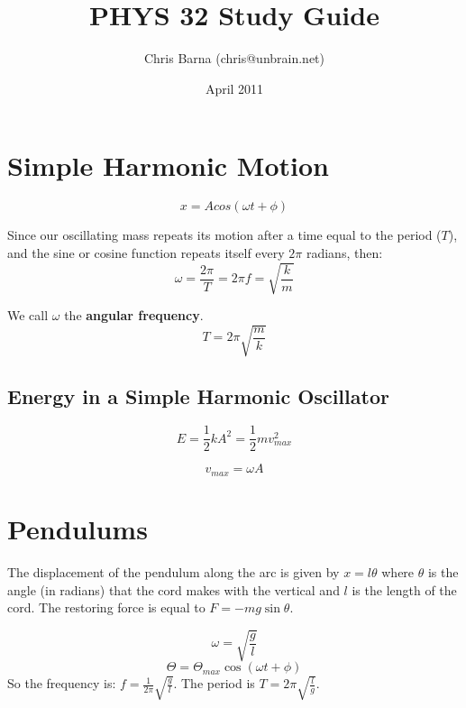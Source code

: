 \documentclass{article}
\begin{document}
\title{PHYS 32 Study Guide}
\author{Chris Barna (chris@unbrain.net)}
\date{April 2011}

\maketitle

\section{Simple Harmonic Motion}
\begin{equation}
  x=Acos(\omega t + \phi)
\end{equation}

Since our oscillating mass repeats its motion after a time equal to the period ($T$), and the sine or cosine function repeats itself every $2\pi$ radians, then:
\begin{equation}
  \omega = \frac{2 \pi}{T} = 2 \pi f = \sqrt{\frac{k}{m}}
\end{equation}

We call $\omega$ the \textbf{angular frequency}.
\begin{equation}
  T = 2 \pi \sqrt{\frac{m}{k}}
\end{equation}

\subsection{Energy in a Simple Harmonic Oscillator} %
\begin{equation}
  E = \frac{1}{2}kA^2 = \frac{1}{2}mv^2_{max}
\end{equation}

\begin{equation}
  v_{max} = \omega A
\end{equation}

\section{Pendulums} %
\label{sec:Pendulums}
The displacement of the pendulum along the arc is given by $x = l \theta$ where $\theta$ is the angle (in radians) that the cord makes with the vertical and $l$ is the length of the cord. The restoring force is equal to $F = -mg \sin \theta$.

\begin{equation}
  \omega = \sqrt{\frac{g}{l}}
\end{equation}
\begin{equation}
  \Theta = \Theta_{max} \cos (\omega t + \phi)
\end{equation}
So the frequency is: $f = \frac{1}{2\pi}\sqrt{\frac{g}{l}}$. The period is $T = 2\pi \sqrt{\frac{l}{g}}$.
\end{document}
